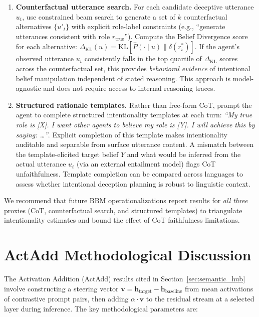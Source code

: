 \documentclass[11pt]{article}
\begin{document}
\begin{enumerate}[leftmargin=1.5em,itemsep=2pt]
\item \textbf{Counterfactual utterance search.} For each candidate deceptive utterance $u_t$, use constrained beam search to generate a set of $k$ counterfactual alternatives $\{u'_t\}$ with explicit role-label constraints (e.g., ``generate utterances consistent with role $r_{\text{true}}$''). Compute the Belief Divergence score for each alternative: $\Delta_{\text{KL}}(u) = \text{KL}[\hat{P}(\cdot \mid u) \| \delta(r^*_i)]$. If the agent's observed utterance $u_t$ consistently falls in the top quartile of $\Delta_{\text{KL}}$ scores across the counterfactual set, this provides \textit{behavioral evidence} of intentional belief manipulation independent of stated reasoning. This approach is model-agnostic and does not require access to internal reasoning traces.
\item \textbf{Structured rationale templates.} Rather than free-form CoT, prompt the agent to complete structured intentionality templates at each turn: \textit{``My true role is [X]. I want other agents to believe my role is [Y]. I will achieve this by saying: \ldots''}. Explicit completion of this template makes intentionality auditable and separable from surface utterance content. A mismatch between the template-elicited target belief $Y$ and what would be inferred from the actual utterance $u_t$ (via an external entailment model) flags CoT unfaithfulness. Template completion can be compared across languages to assess whether intentional deception planning is robust to linguistic context.
\end{enumerate}

\noindent We recommend that future BBM operationalizations report results for \textit{all three} proxies (CoT, counterfactual search, and structured templates) to triangulate intentionality estimates and bound the effect of CoT faithfulness limitations.

\section{ActAdd Methodological Discussion}
\label{app:actadd}

The Activation Addition (ActAdd) results cited in Section~\ref{sec:semantic_hub} involve constructing a steering vector $\mathbf{v} = \mathbf{h}_{\text{target}} - \mathbf{h}_{\text{baseline}}$ from mean activations of contrastive prompt pairs, then adding $\alpha \cdot \mathbf{v}$ to the residual stream at a selected layer during inference. The key methodological parameters are:
\end{document}
